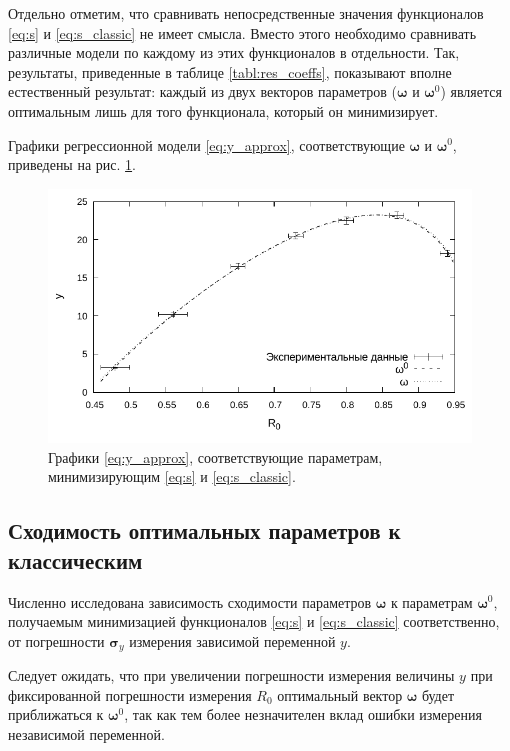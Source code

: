\documentclass[tikz,10pt,a4paper]{article}
\newcommand{\bomega}{\boldsymbol{\omega}}
\begin{document}
Отдельно отметим, что сравнивать непосредственные значения функционалов \eqref{eq:s} и
\eqref{eq:s_classic} не имеет смысла. Вместо этого необходимо сравнивать различные
модели по каждому из этих функционалов в отдельности. Так, результаты, приведенные
в таблице \ref{tabl:res_coeffs}, показывают вполне естественный результат: каждый
из двух векторов параметров ($\bomega$ и $\bomega^0$) является оптимальным лишь
для того функционала, который он минимизирует.

Графики регрессионной модели \eqref{eq:y_approx}, соответствующие $\bomega$ и $\bomega^0$, приведены
на рис. \ref{fig:results}.

\begin{figure}[h]
  \centering
  \includegraphics[width=\textwidth]{figs/levmar/results_bw.pdf}
  \caption{Графики \eqref{eq:y_approx}, соответствующие параметрам,
	минимизирующим \eqref{eq:s} и \eqref{eq:s_classic}.}
  \label{fig:results}
\end{figure}

\subsection{Сходимость оптимальных параметров к классическим}
Численно исследована зависимость сходимости параметров $\bomega$ к параметрам $\bomega^0$,
получаемым минимизацией функционалов \eqref{eq:s} и \eqref{eq:s_classic} соответственно, от
погрешности $\mathbf{\sigma}_y$ измерения зависимой переменной $y$.

Следует ожидать, что при увеличении погрешности измерения величины $y$ при
фиксированной погрешности измерения $R_0$ оптимальный вектор $\bomega$
будет приближаться к $\bomega^0$, так как тем более незначителен
вклад ошибки измерения независимой переменной.
\end{document}
